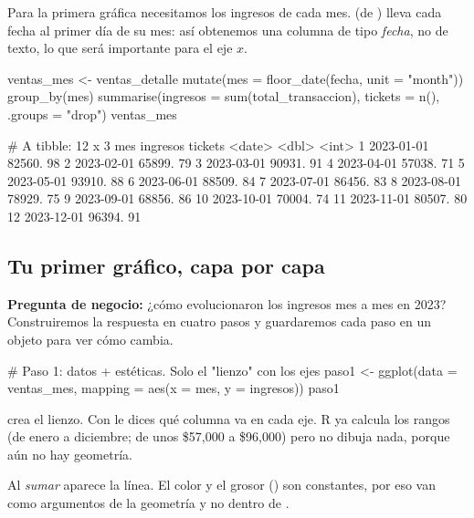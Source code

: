 Para la primera gráfica necesitamos los ingresos de cada mes.
 (de ) lleva
cada fecha al primer día de su mes: así obtenemos una columna de tipo
\emph{fecha}, no de texto, lo que será importante para el eje $x$.

\begin{rcode}
ventas_mes <- ventas_detalle %
  mutate(mes = floor_date(fecha, unit = "month")) %
  group_by(mes) %
  summarise(ingresos = sum(total_transaccion),
            tickets  = n(),
            .groups  = "drop")
ventas_mes
\end{rcode}
\begin{rsalida}
# A tibble: 12 x 3
   mes        ingresos tickets
   <date>        <dbl>   <int>
 1 2023-01-01   82560.      98
 2 2023-02-01   65899.      79
 3 2023-03-01   90931.      91
 4 2023-04-01   57038.      71
 5 2023-05-01   93910.      88
 6 2023-06-01   88509.      84
 7 2023-07-01   86456.      83
 8 2023-08-01   78929.      75
 9 2023-09-01   68856.      86
10 2023-10-01   70004.      74
11 2023-11-01   80507.      80
12 2023-12-01   96394.      91
\end{rsalida}

\subsection{Tu primer gráfico, capa por capa}

\textbf{Pregunta de negocio:} ¿cómo evolucionaron los ingresos mes a mes en
2023? Construiremos la respuesta en cuatro pasos y guardaremos cada paso en
un objeto para ver cómo cambia.

\begin{rcode}
# Paso 1: datos + estéticas. Solo el "lienzo" con los ejes
paso1 <- ggplot(data = ventas_mes, mapping = aes(x = mes, y = ingresos))
paso1
\end{rcode}

 crea el lienzo. Con 
le dices qué columna va en cada eje. R ya calcula los rangos (de enero a
diciembre; de unos \$57,000 a \$96,000) pero no dibuja nada, porque aún no
hay geometría.


Al \emph{sumar}  aparece la línea. El color y el grosor
() son constantes, por eso van como argumentos de la
geometría y no dentro de .

